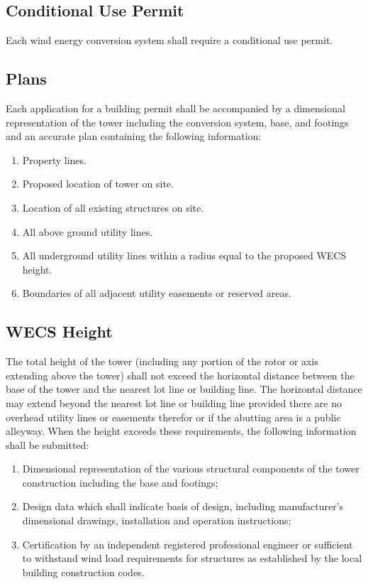 \subsection{Conditional Use Permit}
Each wind energy conversion system shall require a conditional use permit.
\subsection{Plans}
Each application for a building permit shall be accompanied by a dimensional representation of the tower including the conversion system, base, and footings and an accurate plan containing the following information:
\begin{enumerate}[{\indent}1)]
    \item Property lines.
    \item Proposed location of tower on site.
    \item Location of all existing structures on site.
    \item All above ground utility lines.
    \item All underground utility lines within a radius equal to the proposed WECS height.
    \item Boundaries of all adjacent utility easements or reserved areas.
\end{enumerate}
\subsection{WECS Height}
The total height of the tower (including any portion of the rotor or axis extending above the tower) shall not exceed the horizontal distance between the base of the tower and the nearest lot line or building line. The horizontal distance may extend beyond the nearest lot line or building line provided there are no overhead utility lines or easements therefor or if the abutting area is a public alleyway. When the height exceeds these requirements, the following information shall be submitted:
\begin{enumerate}[{\indent}1)]
    \item Dimensional representation of the various structural components of the tower construction including the base and footings;
    \item Design data which shall indicate basis of design, including manufacturer’s dimensional drawings, installation and operation instructions;
    \item Certification by an independent registered professional engineer or sufficient to withstand wind load requirements for structures as established by the local building construction codes.
\end{enumerate}
